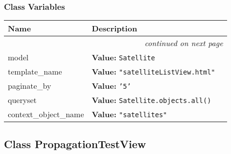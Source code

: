 
  \subsubsection{Class Variables}

    \vspace{-1cm}
\hspace{\varindent}\begin{longtable}{|p{\varnamewidth}|p{\vardescrwidth}|l}
\cline{1-2}
\cline{1-2} \centering \textbf{Name} & \centering \textbf{Description}& \\
\cline{1-2}
\endhead\cline{1-2}\multicolumn{3}{r}{\small\textit{continued on next page}}\\\endfoot\cline{1-2}
\endlastfoot\raggedright m\-o\-d\-e\-l\- & \raggedright \textbf{Value:} 
{\tt Satellite}&\\
\cline{1-2}
\raggedright t\-e\-m\-p\-l\-a\-t\-e\-\_\-n\-a\-m\-e\- & \raggedright \textbf{Value:} 
{\tt "satelliteListView.html"}&\\
\cline{1-2}
\raggedright p\-a\-g\-i\-n\-a\-t\-e\-\_\-b\-y\- & \raggedright \textbf{Value:} 
{\tt '5'}&\\
\cline{1-2}
\raggedright q\-u\-e\-r\-y\-s\-e\-t\- & \raggedright \textbf{Value:} 
{\tt Satellite.objects.all()}&\\
\cline{1-2}
\raggedright c\-o\-n\-t\-e\-x\-t\-\_\-o\-b\-j\-e\-c\-t\-\_\-n\-a\-m\-e\- & \raggedright \textbf{Value:} 
{\tt "satellites"}&\\
\cline{1-2}
\end{longtable}



\subsection{Class PropagationTestView}

